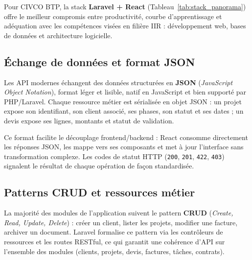 Pour CIVCO BTP, la stack \textbf{Laravel + React} (Tableau~\ref{tab:stack_panorama})
offre le meilleur compromis entre productivité, courbe d'apprentissage et adéquation
avec les compétences visées en filière IIR : développement web, bases de données et
architecture logicielle.

\subsection{Échange de données et format JSON}

Les API modernes échangent des données structurées en \textbf{JSON} (\textit{JavaScript
Object Notation}), format léger et lisible, natif en JavaScript et bien supporté par
PHP/Laravel. Chaque ressource métier est sérialisée en objet JSON : un projet expose
son identifiant, son client associé, ses phases, son statut et ses dates ; un devis
expose ses lignes, montants et statut de validation.

\medskip

Ce format facilite le découplage frontend/backend : React consomme directement les
réponses JSON, les mappe vers ses composants et met à jour l'interface sans
transformation complexe. Les codes de statut HTTP (\texttt{200}, \texttt{201},
\texttt{422}, \texttt{403}) signalent le résultat de chaque opération de façon
standardisée.

\subsection{Patterns CRUD et ressources métier}

La majorité des modules de l'application suivent le pattern \textbf{CRUD}
(\textit{Create, Read, Update, Delete}) : créer un client, lister les projets,
modifier une facture, archiver un document. Laravel formalise ce pattern via les
contrôleurs de ressources et les routes RESTful, ce qui garantit une cohérence
d'API sur l'ensemble des modules (clients, projets, devis, factures, tâches,
contrats).

